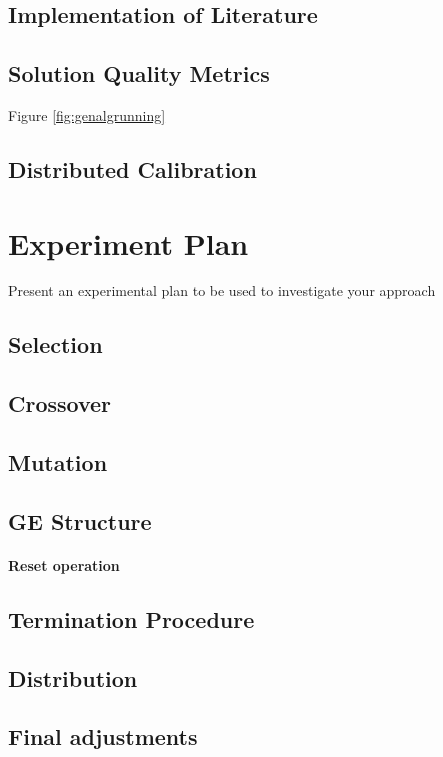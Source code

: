\documentclass[14pt]{acmsiggraph}
\begin{document}
\subsection{Implementation of Literature}
\lipsum[7]

\subsection{Solution Quality Metrics}
Figure \ref{fig:genalgrunning}
\lipsum[7]

\subsection{Distributed Calibration }
\lipsum[7]


\section{Experiment Plan}
Present an experimental plan to be used to investigate your approach
\lipsum[7]
\subsection{Selection}
\lipsum[7]
\subsection{Crossover}
\lipsum[7]
\subsection{Mutation}
\lipsum[7]
\subsection{GE Structure}
\lipsum[7]
\paragraph{Reset operation}
\lipsum[7]
\subsection{Termination Procedure}
\lipsum[7]
\subsection{Distribution}
\lipsum[7]
\subsection{Final adjustments}
\lipsum[7]
\end{document}
